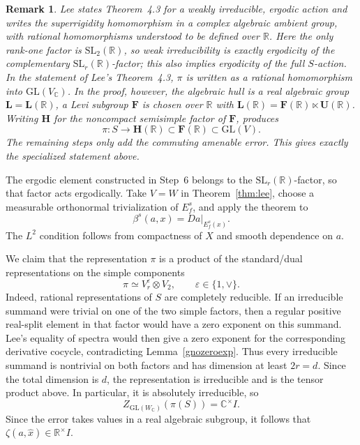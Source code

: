 \documentclass[11pt]{amsart}
\numberwithin{equation}{section}
\newcommand{\SL}{\mathrm{SL}}
\newcommand{\GL}{\mathrm{GL}}
\theoremstyle{plain}
\newtheorem{rmk}[thm]{Remark}
\begin{document}
\begin{rmk}
Lee states Theorem~4.3 for a weakly irreducible, ergodic action and
writes the superrigidity homomorphism in a complex algebraic ambient
group, with rational homomorphisms understood to be defined over
$\mathbb R$.  Here the only rank-one factor is $\SL_2(\mathbb R)$, so
weak irreducibility is exactly ergodicity of the complementary
$\SL_r(\mathbb R)$-factor; this also implies ergodicity of the full
$S$-action.  In the statement of Lee's Theorem~4.3, $\pi$ is written as
a rational homomorphism into $\GL(V_{\mathbb C})$.  In the proof,
however, the algebraic hull is a real algebraic group
$\mathbf L=\mathbf L(\mathbb R)$, a Levi subgroup $\mathbf F$ is chosen
over $\mathbb R$ with
$\mathbf L(\mathbb R)=\mathbf F(\mathbb R)\ltimes\mathbf U(\mathbb R)$.
Writing $\mathbf H$ for the noncompact semisimple factor of
$\mathbf F$, \cite[Theorem~4.1]{Lee} produces
\[
\pi:S\longrightarrow\mathbf H(\mathbb R)
 \subset\mathbf F(\mathbb R)\subset\GL(V).
\]
The remaining steps only add the commuting amenable error.  This gives
exactly the specialized statement above.
\end{rmk}

The ergodic element constructed in Step~6 belongs to the
$\SL_r(\mathbb R)$-factor, so that factor acts ergodically.  Take $V=W$
in Theorem~\ref{thm:lee}, choose a measurable orthonormal trivialization
of $E_f^s$, and apply the theorem to
\[
\beta^s(a,x)=Da|_{E_f^s(x)}.
\]
The $L^2$ condition follows from compactness of $X$ and smooth
dependence on $a$.

We claim that the representation $\pi$ is a product of the standard/dual representations on the simple components
\[
\pi\simeq V_r^\varepsilon\otimes V_2,
\qquad \varepsilon\in\{1,\vee\}.
\]
Indeed, rational representations of $S$ are completely reducible.
If an irreducible summand were trivial on one of the two simple
factors, then a regular positive real-split element in that factor
would have a zero exponent on this summand. Lee's equality of spectra
would then give a zero exponent for the corresponding derivative
cocycle, contradicting Lemma~\ref{gnozeroexp}. Thus every irreducible
summand is nontrivial on both factors and has dimension at least
$2r=d$. Since the total dimension is $d$, the representation is
irreducible and is the tensor product above. In particular, it is
absolutely irreducible, so
\[
Z_{\GL(W_\mathbb C)}(\pi(S))=\mathbb C^\times I.
\]
Since the error takes values in a real algebraic subgroup, it follows
that $\zeta(a,\hat x)\in\mathbb R^\times I$.
\end{document}
